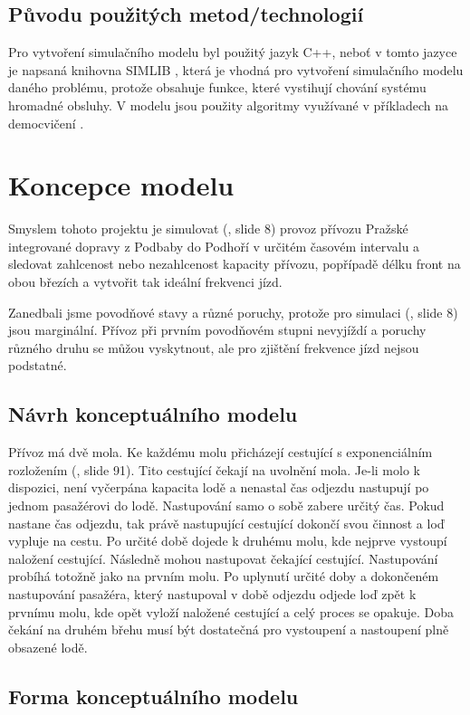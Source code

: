 \documentclass[11pt,a4paper]{article}
\begin{document}
  \subsection{Původu použitých metod/technologií}
  Pro vytvoření simulačního modelu byl použitý jazyk C++, neboť v tomto jazyce je napsaná knihovna SIMLIB \cite{SIMLIB},
  která je vhodná pro vytvoření simulačního modelu daného problému, protože obsahuje funkce, které vystihují
  chování systému hromadné obsluhy. V modelu jsou použity algoritmy využívané v příkladech na democvičení \cite{DEMOCVIKO}.

  \section{Koncepce modelu}
  Smyslem tohoto projektu je simulovat (\cite{SLAJD}, slide 8) provoz přívozu Pražské integrované dopravy
  z Podbaby do Podhoří v určitém časovém intervalu a sledovat zahlcenost nebo nezahlcenost kapacity přívozu,
  popřípadě délku front na obou březích a vytvořit tak ideální frekvenci jízd.

  Zanedbali jsme povodňové stavy a různé poruchy, protože pro simulaci (\cite{SLAJD}, slide 8)
  jsou marginální. Přívoz při prvním povodňovém stupni nevyjíždí a poruchy různého druhu se
  můžou vyskytnout, ale pro zjištění frekvence jízd nejsou podstatné.

  \subsection{Návrh konceptuálního modelu}
  Přívoz má dvě mola. Ke každému molu přicházejí cestující s exponenciálním rozložením (\cite{SLAJD}, slide 91).
  Tito cestující čekají na uvolnění mola. Je-li molo k dispozici, není vyčerpána kapacita lodě a nenastal čas odjezdu
  nastupují po jednom pasažérovi do lodě. Nastupování samo o sobě zabere určitý čas. Pokud nastane čas odjezdu, tak právě
  nastupující cestující dokončí svou činnost a loď vypluje na cestu. Po určité době dojede k druhému molu, kde nejprve vystoupí naložení cestující.
  Následně mohou nastupovat čekající cestující. Nastupování probíhá totožně jako na prvním molu.
  Po uplynutí určité doby a dokončeném nastupování pasažéra, který nastupoval v době odjezdu odjede loď zpět k
  prvnímu molu, kde opět vyloží naložené cestující a celý proces se opakuje. Doba čekání na druhém břehu musí být
  dostatečná pro vystoupení a nastoupení plně obsazené lodě.

  \subsection{Forma konceptuálního modelu}
\end{document}
